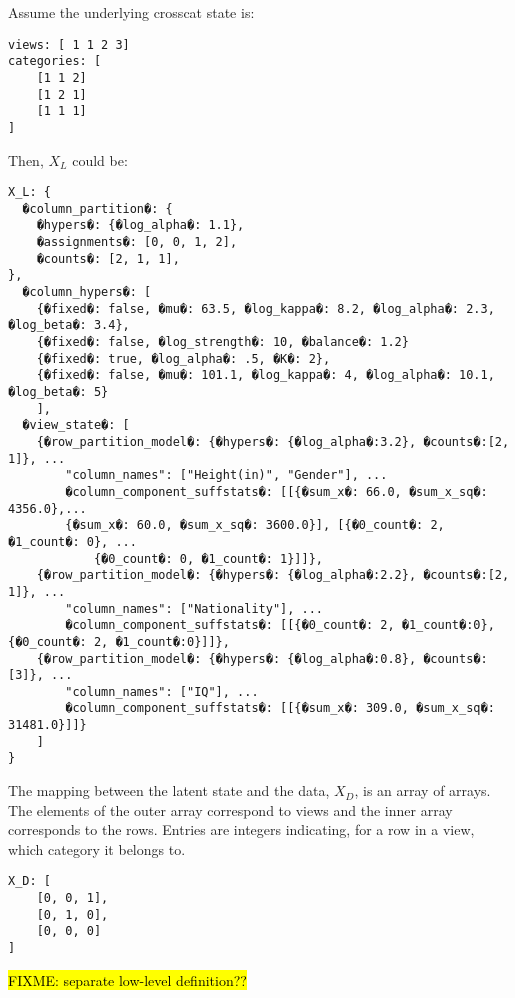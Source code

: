 \documentclass[11pt]{article}
\begin{document}
Assume the underlying crosscat state is:
\begin{verbatim}
views: [ 1 1 2 3]
categories: [
	[1 1 2]
	[1 2 1]
	[1 1 1]
]
\end{verbatim}

Then, $X_L$ could be: 
\begin{verbatim}
X_L: {
  �column_partition�: {
	�hypers�: {�log_alpha�: 1.1},
	�assignments�: [0, 0, 1, 2],
	�counts�: [2, 1, 1],
},
  �column_hypers�: [
	{�fixed�: false, �mu�: 63.5, �log_kappa�: 8.2, �log_alpha�: 2.3, �log_beta�: 3.4},
	{�fixed�: false, �log_strength�: 10, �balance�: 1.2}
	{�fixed�: true, �log_alpha�: .5, �K�: 2},
	{�fixed�: false, �mu�: 101.1, �log_kappa�: 4, �log_alpha�: 10.1, �log_beta�: 5}
	],
  �view_state�: [
	{�row_partition_model�: {�hypers�: {�log_alpha�:3.2}, �counts�:[2, 1]}, ...
		"column_names": ["Height(in)", "Gender"], ...
		�column_component_suffstats�: [[{�sum_x�: 66.0, �sum_x_sq�: 4356.0},...
		{�sum_x�: 60.0, �sum_x_sq�: 3600.0}], [{�0_count�: 2, �1_count�: 0}, ...
			{�0_count�: 0, �1_count�: 1}]]},
	{�row_partition_model�: {�hypers�: {�log_alpha�:2.2}, �counts�:[2, 1]}, ...
		"column_names": ["Nationality"], ...
		�column_component_suffstats�: [[{�0_count�: 2, �1_count�:0},{�0_count�: 2, �1_count�:0}]]},
	{�row_partition_model�: {�hypers�: {�log_alpha�:0.8}, �counts�:[3]}, ...
		"column_names": ["IQ"], ...
		�column_component_suffstats�: [[{�sum_x�: 309.0, �sum_x_sq�: 31481.0}]]}
	]
}
\end{verbatim}

The mapping between the latent state and the data, $X_D$, is an array of arrays. The elements of the outer array correspond to views and the inner array corresponds to the rows. Entries are integers indicating, for a row in a view, which category it belongs to.

\begin{verbatim}
X_D: [
	[0, 0, 1],
	[0, 1, 0],
	[0, 0, 0]
]
\end{verbatim}

\hl{FIXME: separate low-level definition??}
\end{document}
